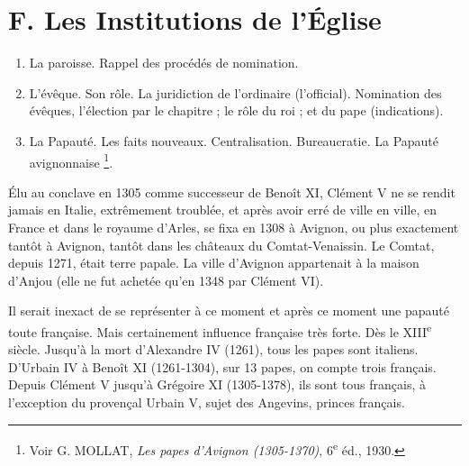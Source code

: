 \documentclass[french,twoside]{book} %
\begin{document}
\section[F. Les Institutions de l’Église]{F. Les Institutions de l’Église}
\label{c10f}

\begin{enumerate}[itemsep=0pt,]
\item La paroisse. Rappel des procédés de nomination.
\item L’évêque. Son rôle. La juridiction de l’ordinaire (l’official). Nomination des évêques, l’élection par le chapitre ; le rôle du roi ; et du pape (indications).
\item La Papauté. Les faits nouveaux. Centralisation. Bureaucratie. La Papauté avignonnaise \footnote{ Voir G. MOLLAT, {\itshape Les papes d’Avignon (1305-1370)}, 6\textsuperscript{e} éd., 1930.}.

\end{enumerate}\noindent Élu au conclave en 1305 comme successeur de Benoît XI, Clément V ne se rendit jamais en Italie, extrêmement troublée, et après  
\label{p113} avoir erré de ville en ville, en France et dans le royaume d’Arles, se fixa en 1308 à Avignon, ou plus exactement tantôt à Avignon, tantôt dans les châteaux du Comtat-Venaissin. Le Comtat, depuis 1271, était terre papale. La ville d’Avignon appartenait à la maison d’Anjou (elle ne fut achetée qu’en 1348 par Clément VI).\par
Il serait inexact de se représenter à ce moment et après ce moment une papauté toute française. Mais certainement influence française très forte. Dès le XIII\textsuperscript{e} siècle. Jusqu’à la mort d’Alexandre IV (1261), tous les papes sont italiens. D’Urbain IV à Benoît XI (1261-1304), sur 13 papes, on compte trois français. Depuis Clément V jusqu’à Grégoire XI (1305-1378), ils sont tous français, à l’exception du provençal Urbain V, sujet des Angevins, princes français.\par
\end{document}
